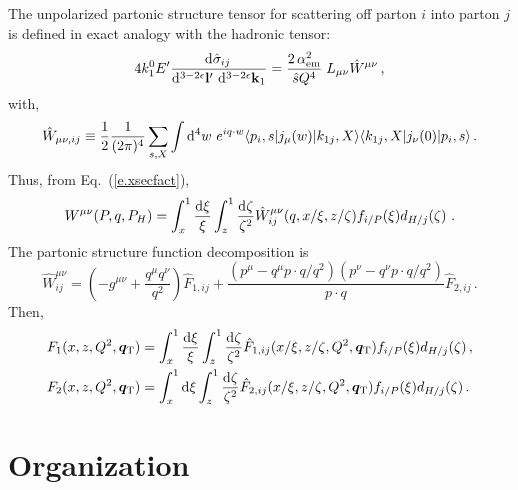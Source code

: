 \documentclass[prd,preprintnumbers,nofootinbib,superscriptaddress,onecolumn,preprint]{revtex4-1}
\newcommand{\T}[2]{\boldsymbol{#1}_{#2\text{T}}}
\newcommand\3[1]{\boldsymbol{#1}}
\newcommand{\eref}[1]{Eq.~(\ref{e.#1})}
\begin{document}
The unpolarized partonic structure tensor for scattering off parton
$i$ into parton $j$ is defined in exact analogy with the hadronic
tensor:
%
\begin{equation}
4 k_1^0 E^\prime 
\frac{\diff{\hat{\sigma}_{ij}}{}}
     {\diff{^{3-2 \epsilon} {\bf l}{'}} \, \diff{^{3- 2 \epsilon} {\bf k}_1 }}
= \frac{2 \, \alpha_{\rm em}^2 }{\hat{s} Q^4} \; L_{\mu \nu} \hat{W}^{\mu \nu}\, ,
\label{e.colfac0p}
\end{equation}
%
with,
%
\begin{align}
\hat{W}_{\mu\nu, ij} \equiv 
  \frac{1}{2} \frac{1}{(2 \pi)^4} 
  \sum_{s,X} \int \diff{^4 w}{} \, e^{i q \cdot w} 
  \langle p_i,s| j_{\mu}(w) | k_{1j},X \rangle 
  \langle k_{1j},X | j_{\nu}(0) | p_i, s\rangle \, .
\label{e.prttsr}
\end{align}
%
Thus, from \eref{xsecfact}, 
%
\begin{equation}
W^{\mu \nu}(P,q,P_H) = 
  \int_{x}^{1} \frac{\diff{\xi}}{\xi} 
  \int_{z}^{1} \frac{\diff{\zeta}}{\zeta^2} 
  \hat{W}^{\mu \nu}_{ij}(q,x/\xi,z/\zeta) 
  f_{i/P}(\xi) d_{H/j}(\zeta) \, 
  \, . \label{e.factform}
\end{equation}
%
The partonic structure function decomposition is
%
\begin{equation}
\hat{W}^{\mu \nu}_{ij} =  
   \left(-g^{\mu \nu} + \frac{q^{\mu} q^{\nu}}{q^2} \right) \hat{F}_{1,ij} 
  +\frac{(p^\mu - q^\mu p \cdot q / q^2) (p^\nu - q^\nu p \cdot q / q^2)}
        {p \cdot q} \hat{F}_{2, ij} 
  \, .
\label{e.structdecpar}
\end{equation}
%
Then,
%
\begin{align}
F_1(x,z,Q^2,\T{q}{}) {}& = \int_{x}^{1} 
                         \frac{\diff{\xi}}{\xi} \int_{z}^{1} 
                         \frac{\diff{\zeta}}{\zeta^2} 
                         \hat{F}_{1, ij}(x/\xi,z/\zeta,Q^2,\T{q}{}) 
                         f_{i/P}(\xi) d_{H/j}(\zeta) 
                         \, , \\
F_2(x,z,Q^2,\T{q}{}) {}&=  \int_{x}^{1} \diff{\xi} 
                         \int_{z}^{1} \frac{\diff{\zeta}}{\zeta^2}
                         \hat{F}_{2, ij}(x/\xi,z/\zeta,Q^2,\T{q}{}) 
                         f_{i/P}(\xi) d_{H/j}(\zeta)
                         \,. 
\end{align}

\section{Organization}
\label{s.organization}
\end{document}
